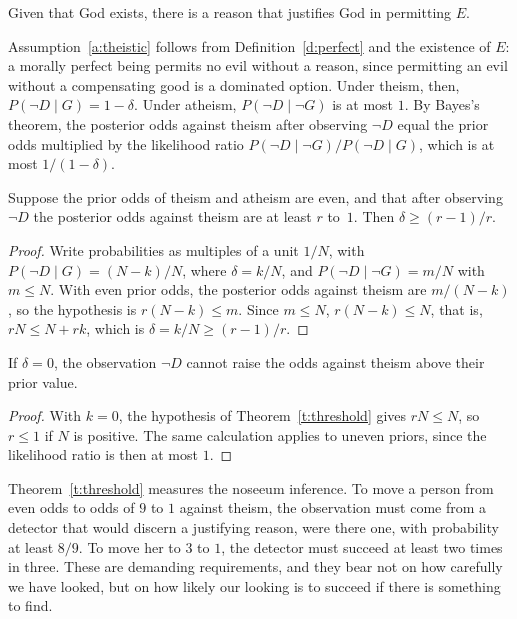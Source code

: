 \documentclass{situationist-preprint}
\begin{document}
\begin{assumption}\label{a:theistic}
Given that God exists, there is a reason that justifies God in permitting $E$.
\end{assumption}

Assumption~\ref{a:theistic} follows from Definition~\ref{d:perfect} and the existence of $E$: a morally perfect being permits no evil without a reason, since permitting an evil without a compensating good is a dominated option. Under theism, then, $P(\neg D \mid G) = 1 - \delta$. Under atheism, $P(\neg D \mid \neg G)$ is at most $1$. By Bayes's theorem, the posterior odds against theism after observing $\neg D$ equal the prior odds multiplied by the likelihood ratio $P(\neg D \mid \neg G) / P(\neg D \mid G)$, which is at most $1/(1 - \delta)$.

\begin{theorem}\label{t:threshold}
Suppose the prior odds of theism and atheism are even, and that after observing $\neg D$ the posterior odds against theism are at least $r$ to~$1$. Then $\delta \geq (r-1)/r$.
\end{theorem}

\begin{proof}
Write probabilities as multiples of a unit $1/N$, with $P(\neg D \mid G) = (N-k)/N$, where $\delta = k/N$, and $P(\neg D \mid \neg G) = m/N$ with $m \leq N$. With even prior odds, the posterior odds against theism are $m/(N-k)$, so the hypothesis is $r(N-k) \leq m$. Since $m \leq N$, $r(N-k) \leq N$, that is, $rN \leq N + rk$, which is $\delta = k/N \geq (r-1)/r$.
\end{proof}

\begin{corollary}\label{c:zero}
If $\delta = 0$, the observation $\neg D$ cannot raise the odds against theism above their prior value.
\end{corollary}

\begin{proof}
With $k = 0$, the hypothesis of Theorem~\ref{t:threshold} gives $rN \leq N$, so $r \leq 1$ if $N$ is positive. The same calculation applies to uneven priors, since the likelihood ratio is then at most $1$.
\end{proof}

Theorem~\ref{t:threshold} measures the noseeum inference. To move a person from even odds to odds of $9$ to $1$ against theism, the observation must come from a detector that would discern a justifying reason, were there one, with probability at least $8/9$. To move her to $3$ to $1$, the detector must succeed at least two times in three. These are demanding requirements, and they bear not on how carefully we have looked, but on how likely our looking is to succeed if there is something to find.
\end{document}
